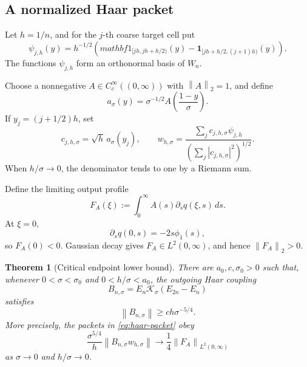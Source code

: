 \documentclass[11pt]{article}
\newtheorem{theorem}{Theorem}[section]
\theoremstyle{definition}
\theoremstyle{remark}
\newcommand{\cK}{\mathcal K}
\newcommand{\norm}[1]{\left\lVert #1\right\rVert}
\begin{document}
\subsection{A normalized Haar packet}

Let \(h=1/n\), and for the \(j\)-th coarse target cell put
\begin{equation}
 \psi_{j,h}(y)
 =h^{-1/2}
 \left(mathbf1_{[jh,jh+h/2)}(y)
 -\mathbf1_{[jh+h/2,(j+1)h)}(y)\right).
 \label{eq:haar-wavelet}
\end{equation}
The functions \(\psi_{j,h}\) form an orthonormal basis of \(W_n\).

Choose a nonnegative \(A\in C_c^\infty((0,\infty))\) with \(\norm A_2=1\),
and define
\begin{equation}
 a_\sigma(y)=\sigma^{-1/2}
 A\!\left(\frac{1-y}{\sigma}\right).
 \label{eq:target-envelope}
\end{equation}
If \(y_j=(j+1/2)h\), set
\begin{equation}
 c_{j,h,\sigma}=\sqrt h\,a_\sigma(y_j),
 \qquad
 w_{h,\sigma}
 =\frac{\sum_jc_{j,h,\sigma}\psi_{j,h}}
 {\left(\sum_j|c_{j,h,\sigma}|^2\right)^{1/2}}.
 \label{eq:haar-packet}
\end{equation}
When \(h/\sigma\to0\), the denominator tends to one by a Riemann sum.

Define the limiting output profile
\begin{equation}
 F_A(\xi)
 :=\int_0^\infty A(s)\partial_s q(\xi,s)\,ds.
 \label{eq:limit-output}
\end{equation}
At \(\xi=0\),
\[
 \partial_s q(0,s)=-2s\phi_1(s),
\]
so \(F_A(0)<0\).  Gaussian decay gives
\(F_A\in L^2(0,\infty)\), and hence \(\norm{F_A}_2>0\).

\begin{theorem}[Critical endpoint lower bound]
\label{thm:endpoint-lower}
There are \(a_0,c,\sigma_0>0\) such that, whenever
\(0<\sigma<\sigma_0\) and \(0<h/\sigma<a_0\), the outgoing Haar coupling
\[
 B_{n,\sigma}=E_n\cK_\sigma(E_{2n}-E_n)
\]
satisfies
\begin{equation}
 \boxed{
 \norm{B_{n,\sigma}}
 \ge c h\sigma^{-5/4}.}
 \label{eq:B-operator-lower}
\end{equation}
More precisely, the packets in \eqref{eq:haar-packet} obey
\begin{equation}
 \frac{\sigma^{5/4}}{h}
 \norm{B_{n,\sigma}w_{h,\sigma}}
 \longrightarrow\frac14\norm{F_A}_{L^2(0,\infty)}
 \label{eq:packet-limit}
\end{equation}
as \(\sigma\to0\) and \(h/\sigma\to0\).
\end{theorem}
\end{document}
